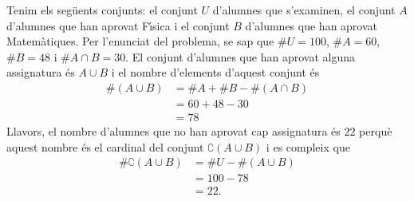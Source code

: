 \begin{solucio}
Tenim els seg\"{u}ents conjunts: el conjunt $U$ d'alumnes que s'examinen, el
conjunt $A$ d'alumnes que han aprovat F\'{\i}sica i el conjunt $B$ d'alumnes
que han aprovat Matem\`{a}tiques. Per l'enunciat del problema, se sap que $%
\#U=100$, $\#A=60$, $\#B=48$ i $\#A\cap B=30$. El conjunt d'alumnes que han
aprovat alguna assignatura \'{e}s $A\cup B$ i el nombre d'elements d'aquest
conjunt \'{e}s%
\begin{align*}
\#\left( A\cup B\right) & =\#A+\#B-\#\left( A\cap B\right) \\
& =60+48-30 \\
& =78
\end{align*}
Llavors, el nombre d'alumnes que no han aprovat cap assignatura \'{e}s $22$
perqu\`{e} aquest nombre \'{e}s el cardinal del conjunt $\complement(A\cup B)
$ i es compleix que%
\begin{align*}
\#\complement(A\cup B) & =\#U-\#\left( A\cup B\right) \\
& =100-78 \\
& =22\text{.}
\end{align*}
\end{solucio}

